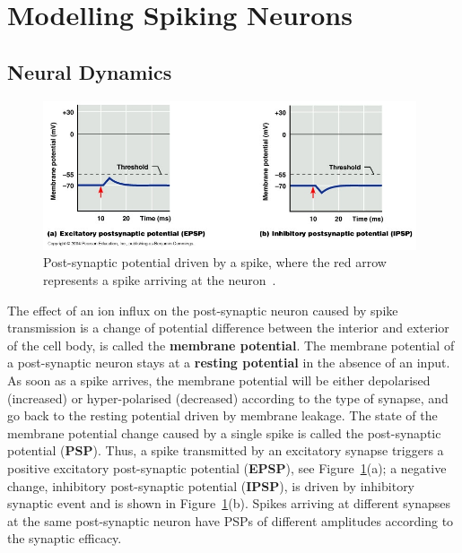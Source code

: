 \section{Modelling Spiking Neurons}
\label{sec:spike}

\subsection{Neural Dynamics}

\begin{figure}[tb!]
	\centering
	\includegraphics[width=0.98\textwidth]{pics_snn/EI_PSP.JPG}
	\caption{Post-synaptic potential driven by a spike, where the red arrow represents a spike arriving at the neuron~\DIFdelbeginFL {}\DIFdelendFL \DIFaddbeginFL {}\DIFaddendFL .}
	\label{Fig:psp}
\end{figure}

The effect of an ion influx on the post-synaptic neuron caused by spike transmission is a change of potential difference between the interior and exterior of the cell body, \DIFdelbegin {}\DIFdelend \DIFaddbegin {}\DIFaddend is called the \textbf{membrane potential}.
The membrane potential of a post-synaptic neuron stays at a \textbf{resting potential} in the absence of an input.
As soon as a spike arrives, the membrane potential will be either depolarised (increased) or hyper-polarised (decreased) according to the type of synapse, and go back to the resting potential driven by \DIFdelbegin {}\DIFdelend membrane leakage.
The state of the membrane potential change caused by a single spike is called the post-synaptic potential (\textbf{PSP}). 
Thus, a spike transmitted by an excitatory synapse triggers a positive \DIFdelbegin {}\DIFdelend \DIFaddbegin {}\DIFaddend excitatory post-synaptic potential (\textbf{EPSP}), see Figure~\ref{Fig:psp}(a);
a negative change, \DIFaddbegin {}\DIFaddend inhibitory post-synaptic potential (\textbf{IPSP}), is driven by \DIFaddbegin {}\DIFaddend inhibitory synaptic event and is shown in Figure~\ref{Fig:psp}(b).
Spikes arriving at different synapses at the same post-synaptic neuron have PSPs of different amplitudes according to the synaptic efficacy.


